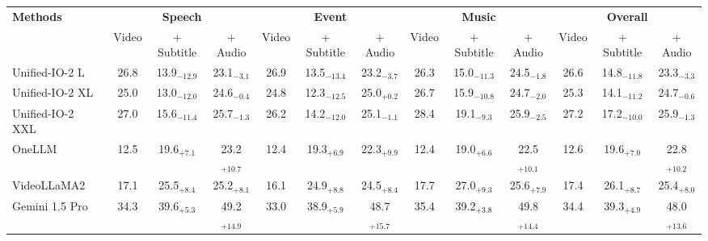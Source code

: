 \begin{tabular}{lcccccccccccc}
\toprule

\multirow{2}{*}{\textbf{Methods}} &  \multicolumn{3}{c}{\textbf{Speech}} & \multicolumn{3}{c}{\textbf{Event}} & \multicolumn{3}{c}{\textbf{Music}} & \multicolumn{3}{c}{\textbf{Overall}} \\
\cmidrule(r){2-4} \cmidrule(r){5-7} \cmidrule(r){8-10} \cmidrule(r){11-13}

 & Video & + Subtitle & + Audio & Video & + Subtitle & + Audio & Video & + Subtitle & + Audio & Video & + Subtitle & + Audio \\


\midrule

Unified-IO-2 L~\cite{lu2024unified} & 26.8 & 13.9{$_{-12.9}$} & 23.1{$_{-3.1}$} & 26.9 & 13.5{$_{-13.4}$} & 23.2{$_{-3.7}$} & 26.3 & 15.0{$_{-11.3}$} & 24.5{$_{-1.8}$} & 26.6 & 14.8{$_{-11.8}$} & 23.3{$_{-3.3}$} \\
Unified-IO-2 XL~\cite{lu2024unified} & 25.0 & 13.0{$_{-12.0}$} & 24.6{$_{-0.4}$} & 24.8 & 12.3{$_{-12.5}$} & 25.0{$_{+0.2}$} & 26.7 & 15.9{$_{-10.8}$} & 24.7{$_{-2.0}$} & 25.3 & 14.1{$_{-11.2}$} & 24.7{$_{-0.6}$}  \\
Unified-IO-2 XXL~\cite{lu2024unified} & 27.0 & 15.6{$_{-11.4}$} & 25.7{$_{-1.3}$} & 26.2 & 14.2{$_{-12.0}$} & 25.1{$_{-1.1}$} & 28.4 & 19.1{$_{-9.3}$} & 25.9{$_{-2.5}$} & 27.2 & 17.2{$_{-10.0}$} & 25.9{$_{-1.3}$} \\
OneLLM~\cite{han2024onellm} & 12.5 & 19.6{$_{+7.1}$} & 23.2{$_{+10.7}$} & 12.4 & 19.3{$_{+6.9}$} & 22.3{$_{+9.9}$} & 12.4 & 19.0{$_{+6.6}$} & 22.5{$_{+10.1}$} & 12.6 & 19.6{$_{+7.0}$} & 22.8{$_{+10.2}$} \\
VideoLLaMA2~\cite{cheng2024videollama} & 17.1 & 25.5{$_{+8.4}$} & 25.2{$_{+8.1}$} & 16.1 & 24.9{$_{+8.8}$} & 24.5{$_{+8.4}$} & 17.7 & 27.0{$_{+9.3}$} & 25.6{$_{+7.9}$} & 17.4 & 26.1{$_{+8.7}$} & 25.4{$_{+8.0}$} \\
Gemini 1.5 Pro~\cite{team2024gemini}  & 34.3 & 39.6{$_{+5.3}$} & 49.2{$_{+14.9}$} & 33.0 & 38.9{$_{+5.9}$} & 48.7{$_{+15.7}$} & 35.4 & 39.2{$_{+3.8}$} & 49.8{$_{+14.4}$} & 34.4 & 39.3{$_{+4.9}$} & 48.0{$_{+13.6}$} \\

\bottomrule
 \end{tabular}